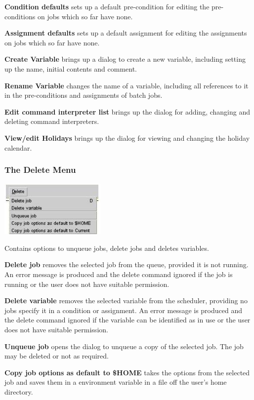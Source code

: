 \textbf{Condition defaults} sets up a default pre-condition for editing the pre-conditions on jobs which so far have none.

\textbf{Assignment defaults} sets up a default assignment for editing the assignments on jobs which so far have none.

\textbf{Create Variable} brings up a dialog to create a new variable, including setting up the name, initial contents and comment.

\textbf{Rename Variable} changes the name of a variable, including all references to it in the pre-conditions and assignments of batch jobs.

\textbf{Edit command interpreter list} brings up the dialog for adding, changing and deleting command interpreters.

\textbf{View/edit Holidays} brings up the dialog for viewing and changing the holiday calendar.

\subsubsection{The Delete Menu}
 \includegraphics[width=5.129cm,height=2.722cm]{img/ref19.jpg} 

Contains options to unqueue jobs, delete jobs and deletes variables.

\textbf{Delete job} removes the selected job from the queue, provided it is not running. An error message is produced and the delete command
ignored if the job is running or the user does not have suitable
permission.

\textbf{Delete variable} removes the selected variable from the scheduler, providing no jobs specify it in a condition or assignment.
An error message is produced and the delete command ignored if the variable can be identified as in use or the user does not have suitable
permission.

\textbf{Unqueue job} opens the dialog to unqueue a copy of the selected job. The job may be deleted or not as required.

\textbf{Copy job options as default to \$HOME} takes the options from the selected job and saves them in a 
environment variable in a file \homeconfigpath{} off the user's home directory.

